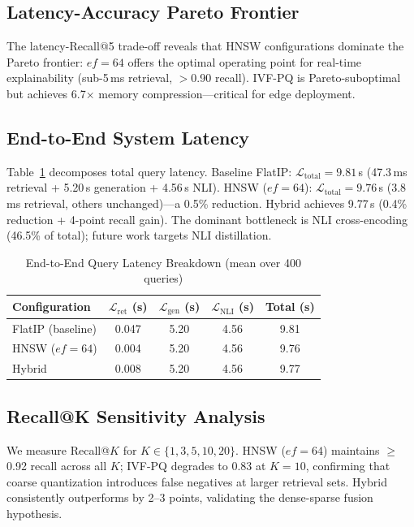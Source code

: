 \documentclass[conference]{IEEEtran}
\begin{document}
\subsection{Latency-Accuracy Pareto Frontier}

The latency-Recall@5 trade-off reveals that HNSW configurations dominate the Pareto frontier: $ef{=}64$ offers the optimal operating point for real-time explainability (sub-5\,ms retrieval, $>$0.90 recall). IVF-PQ is Pareto-suboptimal but achieves 6.7$\times$ memory compression—critical for edge deployment.

\subsection{End-to-End System Latency}

Table~\ref{tab:e2e} decomposes total query latency. Baseline FlatIP: $\mathcal{L}_{\mathrm{total}}{=}9.81$\,s (47.3\,ms retrieval + 5.20\,s generation + 4.56\,s NLI). HNSW ($ef{=}64$): $\mathcal{L}_{\mathrm{total}}{=}9.76$\,s (3.8\,ms retrieval, others unchanged)—a 0.5\% reduction. Hybrid achieves 9.77\,s (0.4\% reduction + 4-point recall gain). The dominant bottleneck is NLI cross-encoding (46.5\% of total); future work targets NLI distillation.

\begin{table}[t]
\caption{End-to-End Query Latency Breakdown (mean over 400 queries)}
\label{tab:e2e}
\centering
\small
\begin{tabular}{@{}lcccc@{}}
\toprule
Configuration & $\mathcal{L}_{\mathrm{ret}}$ (s) & $\mathcal{L}_{\mathrm{gen}}$ (s) & $\mathcal{L}_{\mathrm{NLI}}$ (s) & Total (s) \\
\midrule
FlatIP (baseline) & 0.047 & 5.20 & 4.56 & 9.81 \\
HNSW ($ef{=}64$) & 0.004 & 5.20 & 4.56 & 9.76 \\
Hybrid & 0.008 & 5.20 & 4.56 & 9.77 \\
\bottomrule
\end{tabular}
\end{table}

\subsection{Recall@K Sensitivity Analysis}

We measure Recall@$K$ for $K \in \{1, 3, 5, 10, 20\}$. HNSW ($ef{=}64$) maintains $\geq$0.92 recall across all $K$; IVF-PQ degrades to 0.83 at $K{=}10$, confirming that coarse quantization introduces false negatives at larger retrieval sets. Hybrid consistently outperforms by 2--3 points, validating the dense-sparse fusion hypothesis.
\end{document}
